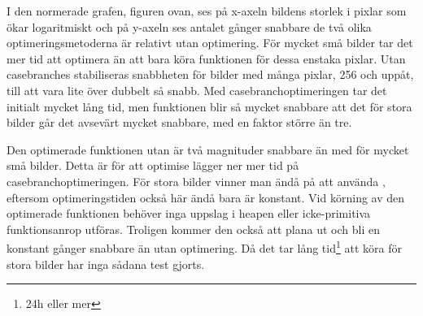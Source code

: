 \documentclass[Rapport]{subfiles}
\begin{document}
I den normerade grafen, figuren ovan, ses
på x-axeln bildens storlek i pixlar som ökar logaritmiskt och 
på y-axeln ses antalet gånger snabbare de två olika optimeringsmetoderna är relativt
utan optimering. 
För mycket små bilder tar det mer tid att optimera än att bara köra
funktionen för dessa enstaka pixlar. Utan casebranches stabiliseras
snabbheten för bilder med många pixlar, 256 och uppåt, till att vara lite över dubbelt
så snabb.
Med casebranchoptimeringen tar det initialt mycket lång tid, men funktionen blir
så mycket snabbare att det för stora bilder går det avsevärt mycket snabbare, med 
en faktor större än tre.

Den optimerade funktionen utan  är två magnituder snabbare
än med  för mycket små bilder. Detta är för att optimise
lägger ner mer tid på casebranchoptimeringen.
För stora bilder vinner man ändå på att använda , eftersom optimeringstiden
också här ändå bara är konstant. Vid körning av den optimerade funktionen
behöver inga uppslag i heapen eller icke-primitiva funktionsanrop utföras. 
Troligen kommer den också att plana
ut och bli en konstant gånger snabbare än utan optimering. Då det tar
lång tid\footnote{24h eller mer} att köra för stora bilder
har inga sådana test gjorts.

\end{document}
